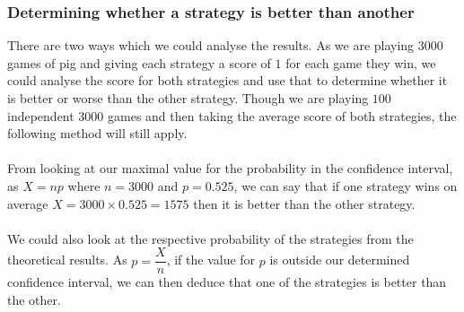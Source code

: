 \documentclass[a4paper,titlepage]{article}
\begin{document}
\subsubsection{Determining whether a strategy is better than another}
There are two ways which we could analyse the results. As we are playing $3000$ games of pig and giving each strategy a score of $1$ for each game they win, we could analyse the score for both strategies and use that to determine whether it is better or worse than the other strategy. Though we are playing $100$ independent $3000$ games and then taking the average score of both strategies, the following method will still apply.\\ \\
From looking at our maximal value for the probability in the confidence interval, as $X=np$ where $n=3000$ and $p=0.525$, we can say that if one strategy wins on average $X=3000\times0.525=1575$ then it is better than the other strategy.\\ \\
We could also look at the respective probability of the strategies from the theoretical results.  As $p=\dfrac{X}{n}$, if the value for $p$ is outside our determined confidence interval, we can then deduce that one of the strategies is better than the other.
\end{document}
